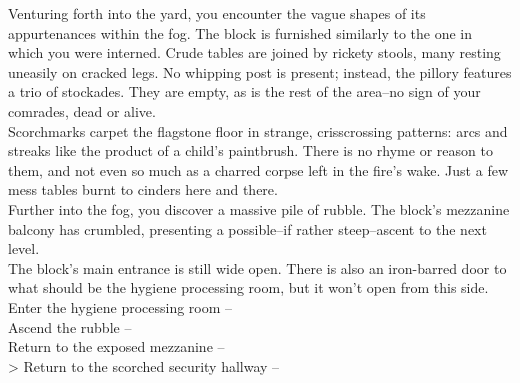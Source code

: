 Venturing forth into the yard, you encounter the vague shapes of its appurtenances within the fog. The block is furnished similarly to the one in which you were interned. Crude tables are joined by rickety stools, many resting uneasily on cracked legs. No whipping post is present; instead, the pillory features a trio of stockades. They are empty, as is the rest of the area--no sign of your comrades, dead or alive.\\

Scorchmarks carpet the flagstone floor in strange, crisscrossing patterns: arcs and streaks like the product of a child’s paintbrush. There is no rhyme or reason to them, and not even so much as a charred corpse left in the fire’s wake. Just a few mess tables burnt to cinders here and there.\\

Further into the fog, you discover a massive pile of rubble. The block's mezzanine balcony has crumbled, presenting a possible--if rather steep--ascent to the next level.\\

The block’s main entrance is still wide open. There is also an iron-barred door to what should be the hygiene processing room, but it won’t open from this side.\\

 Enter the hygiene processing room -- \\
 Ascend the rubble -- \\
 Return to the exposed mezzanine -- \\
> Return to the scorched security hallway -- 